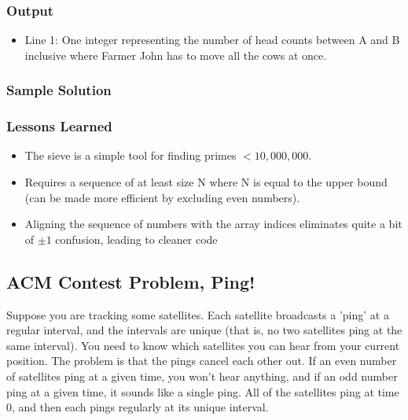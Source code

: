 
\subsubsection{Output}
\begin{itemize}
	\item Line 1: One integer representing the number of head counts between A and B inclusive where Farmer John has to move all the cows at once.
\end{itemize}


\subsubsection{Sample Solution}

\subsubsection{Lessons Learned}
\begin{itemize}
	\item The sieve is a simple tool for finding primes $<10,000,000$.
	\item Requires a sequence of at least size N where N is equal to the upper bound (can be made more efficient by excluding even numbers).
	\item Aligning the sequence of numbers with the array indices eliminates quite a bit of $\pm1$ confusion, leading to cleaner code
\end{itemize}

\subsection{ACM Contest Problem, Ping!}
Suppose you are tracking some satellites.
Each satellite broadcasts a 'ping' at a regular interval, and the intervals are unique (that is, no two satellites ping at the same interval).
You need to know which satellites you can hear from your current position.
The problem is that the pings cancel each other out.
If an even number of satellites ping at a given time, you won't hear anything, and if an odd number ping at a given time, it sounds like a single ping.
All of the satellites ping at time 0, and then each pings regularly at its unique interval.

